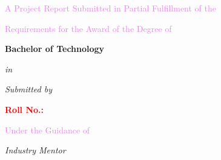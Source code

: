 \thispagestyle{empty}

\begingroup
\centering

{\Large\bfseries\textcolor{black}{\mytitle}\par}

\vspace{0.7cm}

{\normalsize\textcolor{violet}{A Project Report Submitted in Partial Fulfillment of the}\par}
{\normalsize\textcolor{violet}{Requirements for the Award of the Degree of}\par}

\vspace{0.2cm}

{\Large\bfseries Bachelor of Technology\par}

\vspace{0.2cm}

{\normalsize\textit{in}\par}

\vspace{0.2cm}

{\large\bfseries\textcolor{violet}{\mydep}\par}

\vspace{0.5cm}

{\normalsize\textit{Submitted by}\par}

\vspace{0.2cm}

{\Large\bfseries\textcolor{ForestGreen}{\myname}\par}

\vspace{0.1cm}

{\large\bfseries\textcolor{red}{Roll No.: \myrollno}\par}

\vspace{0.5cm}

{\normalsize\textcolor{violet}{Under the Guidance of}\par}

\vspace{0.3cm}

{\normalsize\textit{Industry Mentor}\par}

\vspace{0.1cm}

{\large\bfseries\textcolor{ForestGreen}{\myindustrysupervisor}\par}


